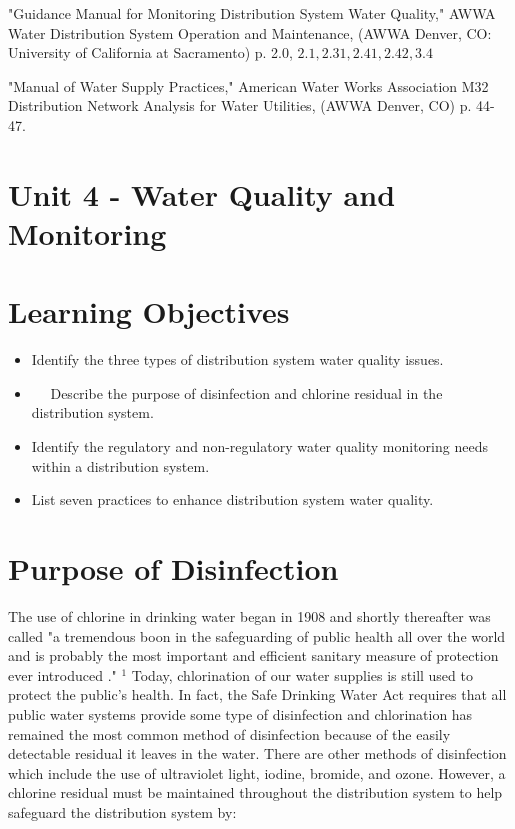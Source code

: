 \documentclass[10pt]{article}
\begin{document}
"Guidance Manual for Monitoring Distribution System Water Quality," AWWA Water Distribution System Operation and Maintenance, (AWWA Denver, CO: University of California at Sacramento) p. 2.0, $2.1,2.31,2.41,2.42,3.4$

"Manual of Water Supply Practices," American Water Works Association M32 Distribution Network Analysis for Water Utilities, (AWWA Denver, CO) p. 44-47.

\section{Unit 4 - Water Quality and Monitoring}
\section{Learning Objectives}
\begin{itemize}
  \item Identify the three types of distribution system water quality issues.

  \item $\quad$ Describe the purpose of disinfection and chlorine residual in the distribution system.

  \item Identify the regulatory and non-regulatory water quality monitoring needs within a distribution system.

  \item List seven practices to enhance distribution system water quality.

\end{itemize}
\section{Purpose of Disinfection}
The use of chlorine in drinking water began in 1908 and shortly thereafter was called "a tremendous boon in the safeguarding of public health all over the world and is probably the most important and efficient sanitary measure of protection ever introduced ." $^{1}$ Today, chlorination of our water supplies is still used to protect the public's health. In fact, the Safe Drinking Water Act requires that all public water systems provide some type of disinfection and chlorination has remained the most common method of disinfection because of the easily detectable residual it leaves in the water. There are other methods of disinfection which include the use of ultraviolet light, iodine, bromide, and ozone. However, a chlorine residual must be maintained throughout the distribution system to help safeguard the distribution system by:
\end{document}
